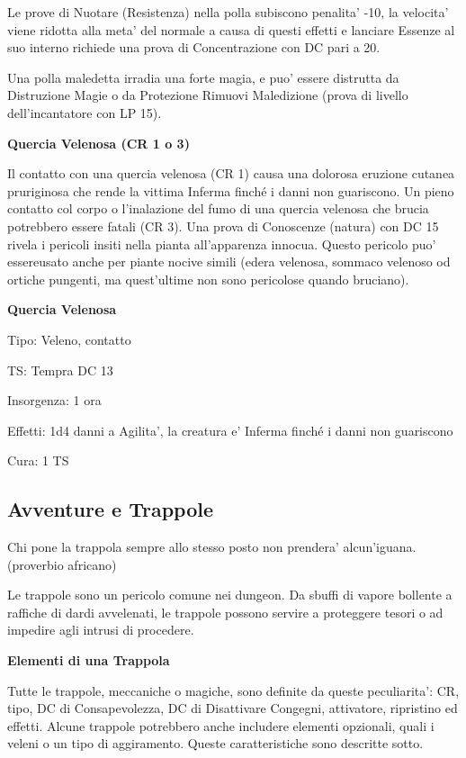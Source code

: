 \documentclass[a4paper,11pt,twoside,openany]{dndbook}
\begin{document}
{Le prove di Nuotare (Resistenza) nella polla subiscono penalita' -10, la velocita' viene ridotta alla meta' del normale a causa di questi effetti e lanciare Essenze al suo interno richiede una prova di Concentrazione con DC pari a 20.

Una polla maledetta irradia una forte magia, e puo' essere distrutta da Distruzione Magie o da Protezione Rimuovi Maledizione (prova di livello dell'incantatore
con LP 15).

\textbf{Quercia Velenosa (CR 1 o 3)}

Il contatto con una quercia velenosa (CR 1) causa una dolorosa eruzione cutanea pruriginosa che rende la vittima Inferma finché i danni non guariscono. Un pieno contatto col corpo o l'inalazione del fumo di una quercia velenosa che brucia potrebbero essere fatali (CR 3). Una prova di Conoscenze (natura) con DC 15 rivela i pericoli insiti nella pianta all'apparenza innocua. Questo pericolo puo' essereusato anche per piante nocive simili (edera velenosa, sommaco velenoso od ortiche pungenti, ma quest'ultime non sono pericolose quando bruciano).

\textbf{Quercia Velenosa}

Tipo: Veleno, contatto

TS: Tempra DC 13

Insorgenza: 1 ora

Effetti: 1d4 danni a Agilita', la creatura e' Inferma finché i danni
non guariscono

Cura: 1 TS

\pagebreak

\subsection{Avventure e Trappole}

\label{avventure-e-trappole}
\begin{quotebox}
Chi pone la trappola sempre allo stesso posto non prendera' alcun'iguana. (proverbio africano)
\end{quotebox}

Le trappole sono un pericolo comune nei dungeon. Da sbuffi di vapore bollente a raffiche di dardi avvelenati, le trappole possono servire a proteggere tesori o ad impedire agli intrusi di procedere. 

\textbf{Elementi di una Trappola}

Tutte le trappole, meccaniche o magiche, sono definite da queste peculiarita': CR, tipo, DC di Consapevolezza, DC di Disattivare Congegni, attivatore, ripristino ed effetti. Alcune trappole potrebbero anche includere elementi opzionali, quali i veleni o un tipo di aggiramento. Queste caratteristiche sono descritte sotto.

}
\end{document}
